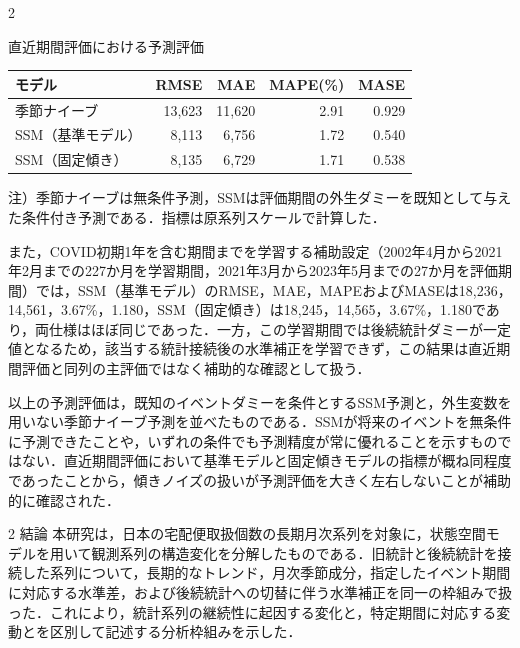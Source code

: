 \documentclass[uplatex,a4paper,10pt]{jsarticle}
\makeatletter
\renewcommand{\section}{\@startsection{section}{1}{\z@}%
  {2\baselineskip}{\baselineskip}%
  {\normalfont\gtfamily\bfseries\fontsize{11pt}{13pt}\selectfont}}
\makeatother
\begin{document}
\begin{multicols}{2}
\par\noindent\begin{minipage}{\linewidth}
  \vspace{0.8\baselineskip}
  \centering
  \label{tab:section6-fixed-b}
  {\fontsize{9pt}{11pt}\selectfont {\gtfamily\bfseries 表-\thetable}\quad 直近期間評価における予測評価\par}
  \vspace{1mm}
  \fontsize{9pt}{11pt}\selectfont
  \renewcommand{\arraystretch}{1.0}
  \setlength{\tabcolsep}{1.5pt}
  \begin{tabular*}{\linewidth}{@{\extracolsep{\fill}}lrrrr@{}}
    \toprule
    モデル & RMSE & MAE & MAPE(\%) & MASE \\
    \midrule
    季節ナイーブ & 13,623 & 11,620 & 2.91 & 0.929 \\
    SSM（基準モデル） & 8,113 & 6,756 & 1.72 & 0.540 \\
    SSM（固定傾き） & 8,135 & 6,729 & 1.71 & 0.538 \\
    \bottomrule
  \end{tabular*}
  \par\vspace{1mm}\raggedright\fontsize{8pt}{10pt}\selectfont
  注）季節ナイーブは無条件予測，SSMは評価期間の外生ダミーを既知として与えた条件付き予測である．指標は原系列スケールで計算した．\par
  \vspace{0.8\baselineskip}
\end{minipage}\par

また，COVID初期1年を含む期間までを学習する補助設定（2002年4月から2021年2月までの227か月を学習期間，2021年3月から2023年5月までの27か月を評価期間）では，SSM（基準モデル）のRMSE，MAE，MAPEおよびMASEは18,236，14,561，3.67\%，1.180，SSM（固定傾き）は18,245，14,565，3.67\%，1.180であり，両仕様はほぼ同じであった．一方，この学習期間では後続統計ダミーが一定値となるため，該当する統計接続後の水準補正を学習できず，この結果は直近期間評価と同列の主評価ではなく補助的な確認として扱う．

以上の予測評価は，既知のイベントダミーを条件とするSSM予測と，外生変数を用いない季節ナイーブ予測を並べたものである．SSMが将来のイベントを無条件に予測できたことや，いずれの条件でも予測精度が常に優れることを示すものではない．直近期間評価において基準モデルと固定傾きモデルの指標が概ね同程度であったことから，傾きノイズの扱いが予測評価を大きく左右しないことが補助的に確認された．

\section{結論}
本研究は，日本の宅配便取扱個数の長期月次系列を対象に，状態空間モデルを用いて観測系列の構造変化を分解したものである．旧統計と後続統計を接続した系列について，長期的なトレンド，月次季節成分，指定したイベント期間に対応する水準差，および後続統計への切替に伴う水準補正を同一の枠組みで扱った．これにより，統計系列の継続性に起因する変化と，特定期間に対応する変動とを区別して記述する分析枠組みを示した．


\end{multicols}
\end{document}
